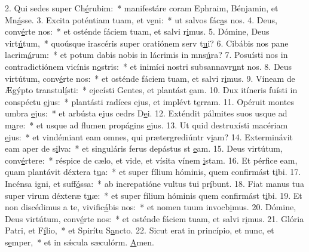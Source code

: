 2. Qui sedes super Ch\uline{é}rubim:~* manifestáre coram Ephraim, Bénjamin, et Mn\uline{á}sse.
3. Excita poténtiam tuam, et v\uline{e}ni:~* ut salvos fác\uline{a}s nos.
4. Deus, conv\uline{é}rte nos:~* et osténde fáciem tuam, et salvi r\uline{i}mus.
5. Dómine, Deus virt\uline{ú}tum,~* quoúsque irascéris super oratiónem serv t\uline{u}i?
6. Cibábis nos pane lacrim\uline{á}rum:~* et potum dabis nobis in lácrimis in mns\uline{ú}ra?
7. Posuísti nos in contradictiónem vicínis n\uline{o}stris:~* et inimíci nostri subsannavr\uline{u}nt nos.
8. Deus virtútum, conv\uline{é}rte nos:~* et osténde fáciem tuam, et salvi r\uline{i}mus.
9. Víneam de Ægýpto transtul\uline{í}sti:~* ejecísti Gentes, et plantást \uline{e}am.
10. Dux itíneris fuísti in conspéctu \uline{e}jus:~* plantásti radíces ejus, et implévt t\uline{e}rram.
11. Opéruit montes umbra \uline{e}jus:~* et arbústa ejus cedrs D\uline{e}i.
12. Exténdit pálmites suos usque ad m\uline{a}re:~* et usque ad flumen propágins \uline{e}jus.
13. Ut quid destruxísti macériam \uline{e}jus:~* et vindémiant eam omnes, qui prætergrediúntr v\uline{i}am?
14. Exterminávit eam aper de s\uline{i}lva:~* et singuláris ferus depástus st \uline{e}am.
15. Deus virtútum, conv\uline{é}rtere:~* réspice de cælo, et vide, et vísita vínem \uline{i}stam.
16. Et pérfice eam, quam plantávit déxtera t\uline{u}a:~* et super fílium hóminis, quem confirmást t\uline{i}bi.
17. Incénsa igni, et suff\uline{ó}ssa:~* ab increpatióne vultus tui pr\uline{í}bunt.
18. Fiat manus tua super virum déxteræ t\uline{u}æ:~* et super fílium hóminis quem confirmást t\uline{i}bi.
19. Et non discédimus a te, vivific\uline{á}bis nos:~* et nomen tuum invocb\uline{i}mus.
20. Dómine, Deus virtútum, conv\uline{é}rte nos:~* et osténde fáciem tuam, et salvi r\uline{i}mus.
21. Glória Patri, et F\uline{í}lio,~* et Spirítu S\uline{a}ncto.
22. Sicut erat in princípio, et nunc, et s\uline{e}mper,~* et in sǽcula sæculórm. \uline{A}men.
